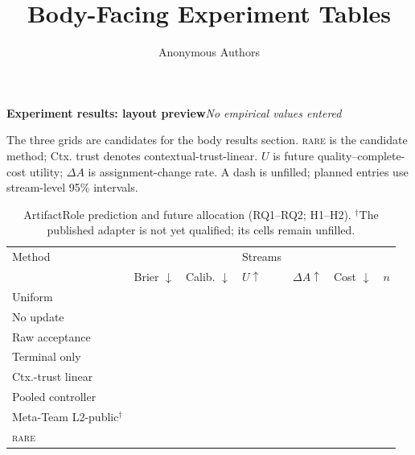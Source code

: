 \documentclass[sigconf,anonymous]{aamas}
\title[Body-Facing Experiment Tables]{Body-Facing Experiment Tables}
\author{Anonymous Authors}
\affiliation{\institution{Internal research draft}}
\newcommand{\blank}{\textemdash}
\newcommand{\rare}{\textsc{rare}}
\newcommand{\dashrow}{\blank & \blank & \blank & \blank & \blank & \blank}
\begin{document}
\onecolumn
\noindent\textbf{Experiment results: layout preview}\hfill\textit{No empirical values entered}

\smallskip
\noindent\small The three grids are candidates for the body results section.
\rare{} is the candidate method; Ctx. trust denotes contextual-trust-linear.
$U$ is future quality--complete-cost utility; $\Delta A$ is assignment-change
rate. A dash is unfilled; planned entries use stream-level 95\% intervals.

\begin{table}[!ht]
\centering
\small
\setlength{\tabcolsep}{4pt}
\renewcommand{\arraystretch}{1.12}
\begin{tabular}{@{}l*{6}{>{\centering\arraybackslash}p{}}@{}}
\toprule
Method & \multicolumn{2}{c}{ArtifactRole: prediction} & \multicolumn{3}{c}{ArtifactRole: allocation} & Streams\\
\cmidrule(lr){2-3}\cmidrule(lr){4-6}
 & Brier $\downarrow$ & Calib. $\downarrow$ & $U\uparrow$ & $\Delta A\uparrow$ & Cost $\downarrow$ & $n$\\
\midrule
Uniform & \blank & \blank & \blank & \blank & \blank & \blank\\
No update & \blank & \blank & \blank & \blank & \blank & \blank\\
Raw acceptance & \blank & \blank & \blank & \blank & \blank & \blank\\
Terminal only & \blank & \blank & \blank & \blank & \blank & \blank\\
Ctx.-trust linear & \blank & \blank & \blank & \blank & \blank & \blank\\
Pooled controller & \blank & \blank & \blank & \blank & \blank & \blank\\
Meta-Team L2-public$^{\dagger}$ & \dashrow\\
\midrule
\rare{} & \blank & \blank & \blank & \blank & \blank & \blank\\
\bottomrule
\end{tabular}
\caption{ArtifactRole prediction and future allocation (RQ1--RQ2; H1--H2). $^{\dagger}$The published adapter is not yet qualified; its cells remain unfilled.}
\label{tab:body-main-results}
\end{table}
\end{document}
